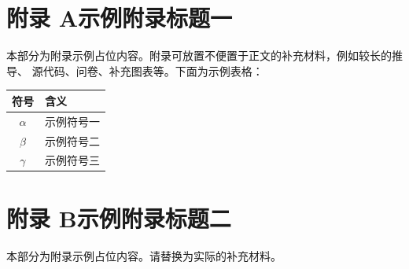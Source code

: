 \begin{appendixpart}
\section*{附录 A\quad 示例附录标题一}

本部分为附录示例占位内容。附录可放置不便置于正文的补充材料，例如较长的推导、
源代码、问卷、补充图表等。下面为示例表格：

\begin{center}
\begin{tabular}{cl}
  \toprule
  符号 & 含义 \\
  \midrule
  $\alpha$ & 示例符号一 \\
  $\beta$  & 示例符号二 \\
  $\gamma$ & 示例符号三 \\
  \bottomrule
\end{tabular}
\end{center}

\section*{附录 B\quad 示例附录标题二}

本部分为附录示例占位内容。请替换为实际的补充材料。
\end{appendixpart}
